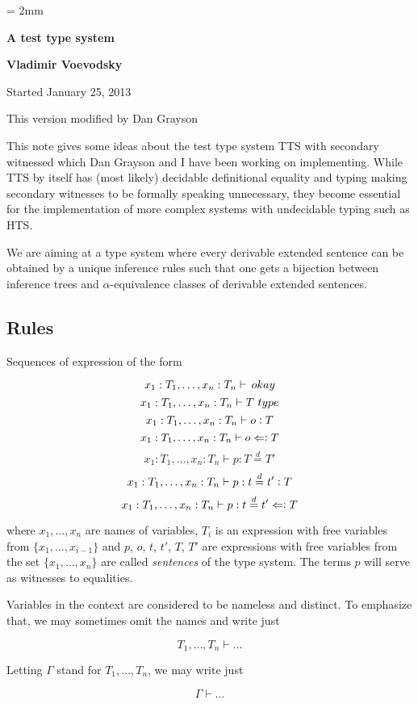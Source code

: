 \documentclass[11pt]{article}
\newcommand{\eqd}{\stackrel{d}{=}}
\newcommand{\synth}{\vcentcolon} %
\newcommand{\ccheck}{\Leftarrow\vcentcolon}
\newcommand{\Type}{\mathop{{\, \sc type}}}
\newcommand{\Okay}{\mathop{{\, \sc okay}}}
\begin{document}
\parskip = 2mm
\begin{center}
{\bf\Large A test type system}

{\bf Vladimir Voevodsky}

{Started January 25, 2013}  

{This version modified by Dan Grayson}  
\end{center}

\tableofcontents

This note gives some ideas about the test type system TTS with secondary
witnessed which Dan Grayson and I have been working on implementing. While TTS
by itself has (most likely) decidable definitional equality and typing making
secondary witnesses to be formally speaking unnecessary, they become essential
for the implementation of more complex systems with undecidable typing such as
HTS.

We are aiming at a type system where every derivable extended sentence can be
obtained by a unique inference rules such that one gets a bijection between
inference trees and $\alpha$-equivalence classes of derivable extended
sentences.

\subsection{Rules}

Sequences of expression of the form

$$x_1:T_1,\dots,x_n:T_n\vdash \Okay$$
$$x_1:T_1,\dots,x_n:T_n\vdash T \Type$$
$$x_1:T_1,\dots,x_n:T_n\vdash o \synth T$$
$$x_1:T_1,\dots,x_n:T_n\vdash o \ccheck T$$
$$x_1:T_1,\dots,x_n:T_n\vdash p : T \eqd T'$$ 
$$x_1:T_1,\dots,x_n:T_n\vdash p : t \eqd t' \synth T$$
$$x_1:T_1,\dots,x_n:T_n\vdash p : t \eqd t' \ccheck T$$

where $x_1,\dots,x_n$ are names of variables, $T_i$ is an expression with free
variables from $\{x_1,\dots,x_{i-1}\}$ and $p$, $o$, $t$, $t'$, $T$, $T'$ are expressions
with free variables from the set $\{x_1,\dots,x_n\}$ are called {\em sentences}
of the type system.  The terms $p$ will serve as witnesses to equalities.

Variables in the context are considered to be nameless and distinct.  To
emphasize that, we may sometimes omit the names and write just 

$$T_1,\dots,T_n\vdash \dots$$

Letting $\Gamma$ stand for $T_1,\dots,T_n$, we may write just

$$\Gamma\vdash \dots$$
\end{document}
